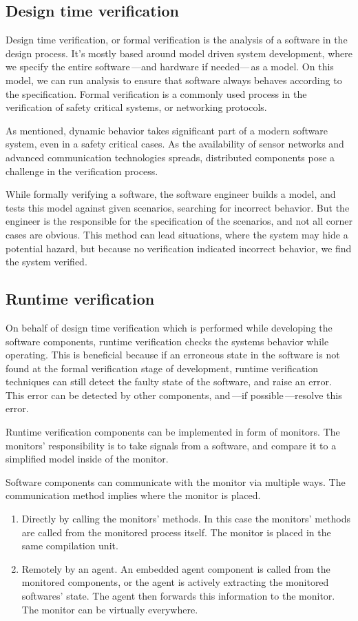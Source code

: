 \subsection{Design time verification}

Design time verification, or formal verification is the analysis of a software in the design process. It's mostly based around model driven system development, where we specify the entire software\,---and hardware if needed---\,as a model. On this model, we can run analysis to ensure that software always behaves according to the specification. Formal verification is a commonly used process in the verification of safety critical systems, or networking protocols.

As mentioned, dynamic behavior takes significant part of a modern software system, even in a safety critical cases. As the availability of sensor networks and advanced communication technologies spreads, distributed components pose a challenge in the verification process.

While formally verifying a software, the software engineer builds a model, and tests this model against given scenarios, searching for incorrect behavior. But the engineer is the responsible for the specification of the scenarios, and not all corner cases are obvious. This method can lead situations, where the system may hide a potential hazard, but because no verification indicated incorrect behavior, we find the system verified.

\subsection{Runtime verification}

On behalf of design time verification which is performed while developing the software components, runtime verification checks the systems behavior while operating. This is beneficial because if an erroneous state in the software is not found at the formal verification stage of development, runtime verification techniques can still detect the faulty state of the software, and raise an error. This error can be detected by other components, and\,---if possible\,---resolve this error.

Runtime verification components can be implemented in form of monitors. The monitors' responsibility is to take signals from a software, and compare it to a simplified model inside of the monitor.

Software components can communicate with the monitor via multiple ways. The communication method implies where the monitor is placed.
\begin{enumerate}
	\item Directly by calling the monitors' methods. In this case the monitors' methods are called from the monitored process itself. The monitor is placed in the same compilation unit.
	      \item\label{item:agent} Remotely by an agent. An embedded agent component is called from the monitored components, or the agent is actively extracting the monitored softwares' state. The agent then forwards this information to the monitor. The monitor can be virtually everywhere.
\end{enumerate}

